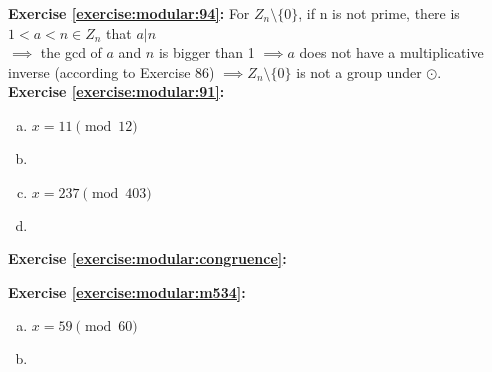 \noindent\textbf{Exercise \ref{exercise:modular:94}:}
For $Z_n \setminus \{0\}$, if n is not prime, there is $1<a<n \in Z_n$ that $a|n$\\
$\implies$  the gcd of $a$ and $n$ is bigger than 1 $\implies a$ does not have a multiplicative inverse (according to Exercise 86) $\implies Z_n \setminus \{0\}$ is not a group under $\odot$.\\

\noindent\textbf{Exercise \ref{exercise:modular:91}:} 
\begin{enumerate}[(a)]
\item
$x=11 \pmod{12}$

\item

\item
$x=237 \pmod{403}$

\item
\end {enumerate}

\noindent\textbf{Exercise \ref{exercise:modular:congruence}:}

\noindent\textbf{Exercise \ref{exercise:modular:m534}:}%
\begin{enumerate}[(a)]
\item
$x=59 \pmod{60}$

\item
\end {enumerate}

